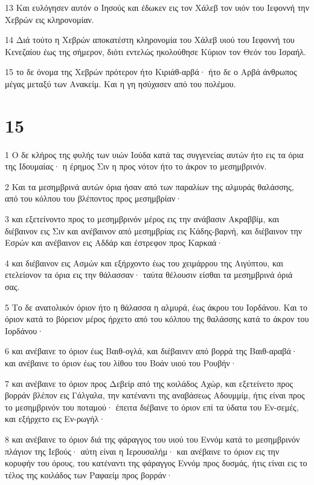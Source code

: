 \par 13 Και ευλόγησεν αυτόν ο Ιησούς και έδωκεν εις τον Χάλεβ τον υιόν του Ιεφοννή την Χεβρών εις κληρονομίαν.
\par 14 Διά τούτο η Χεβρών αποκατέστη κληρονομία του Χάλεβ υιού του Ιεφοννή του Κενεζαίου έως της σήμερον, διότι εντελώς ηκολούθησε Κύριον τον Θεόν του Ισραήλ.
\par 15 το δε όνομα της Χεβρών πρότερον ήτο Κιριάθ-αρβά· ήτο δε ο Αρβά άνθρωπος μέγας μεταξύ των Ανακείμ. Και η γη ησύχασεν από του πολέμου.

\chapter{15}

\par 1 Ο δε κλήρος της φυλής των υιών Ιούδα κατά τας συγγενείας αυτών ήτο εις τα όρια της Ιδουμαίας· η έρημος Σιν η προς νότον ήτο το άκρον το μεσημβρινόν.
\par 2 Και τα μεσημβρινά αυτών όρια ήσαν από των παραλίων της αλμυράς θαλάσσης, από του κόλπου του βλέποντος προς μεσημβρίαν·
\par 3 και εξετείνοντο προς το μεσημβρινόν μέρος εις την ανάβασιν Ακραββίμ, και διέβαινον εις Σιν και ανέβαινον από μεσημβρίας εις Κάδης-βαρνή, και διέβαινον την Εσρών και ανέβαινον εις Αδδάρ και έστρεφον προς Καρκαά·
\par 4 και διέβαινον εις Ασμών και εξήρχοντο έως του χειμάρρου της Αιγύπτου, και ετελείονον τα όρια εις την θάλασσαν· ταύτα θέλουσιν είσθαι τα μεσημβρινά όριά σας.
\par 5 Το δε ανατολικόν όριον ήτο η θάλασσα η αλμυρά, έως άκρου του Ιορδάνου. Και το όριον κατά το βόρειον μέρος ήρχετο από του κόλπου της θαλάσσης κατά το άκρον του Ιορδάνου·
\par 6 και ανέβαινε το όριον έως Βαιθ-ογλά, και διέβαινεν από βορρά της Βαιθ-αραβά· και ανέβαινε το όριον έως του λίθου του Βοάν υιού του Ρουβήν·
\par 7 και ανέβαινε το όριον προς Δεβείρ από της κοιλάδος Αχώρ, και εξετείνετο προς βορράν βλέπον εις Γάλγαλα, την κατέναντι της αναβάσεως Αδουμμίμ, ήτις είναι προς το μεσημβρινόν του ποταμού· έπειτα διέβαινε το όριον επί τα ύδατα του Εν-σεμές, και εξήρχετο εις Εν-ρωγήλ·
\par 8 και ανέβαινε το όριον διά της φάραγγος του υιού του Εννόμ κατά το μεσημβρινόν πλάγιον της Ιεβούς· αύτη είναι η Ιερουσαλήμ· και ανέβαινε το όριον εις την κορυφήν του όρους, του κατέναντι της φάραγγος Εννόμ προς δυσμάς, ήτις είναι εις το τέλος της κοιλάδος των Ραφαείμ προς βορράν·
